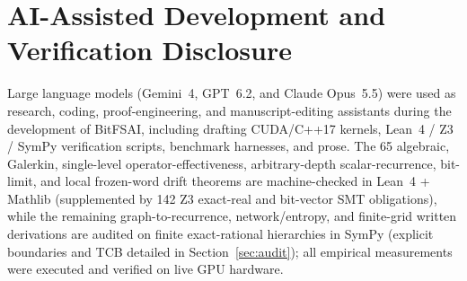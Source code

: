 \documentclass[10pt]{article}
\begin{document}
\section*{AI-Assisted Development and Verification Disclosure}
Large language models (Gemini~4, GPT~6.2, and Claude Opus~5.5) were used as research, coding, proof-engineering, and manuscript-editing assistants during the development of BitFSAI, including drafting CUDA/C++17 kernels, Lean~4 / Z3 / SymPy verification scripts, benchmark harnesses, and prose. The 65 algebraic, Galerkin, single-level operator-effectiveness, arbitrary-depth scalar-recurrence, bit-limit, and local frozen-word drift theorems are machine-checked in Lean~4 + Mathlib (supplemented by 142 Z3 exact-real and bit-vector SMT obligations), while the remaining graph-to-recurrence, network/entropy, and finite-grid written derivations are audited on finite exact-rational hierarchies in SymPy (explicit boundaries and TCB detailed in Section~\ref{sec:audit}); all empirical measurements were executed and verified on live GPU hardware.



\end{document}

